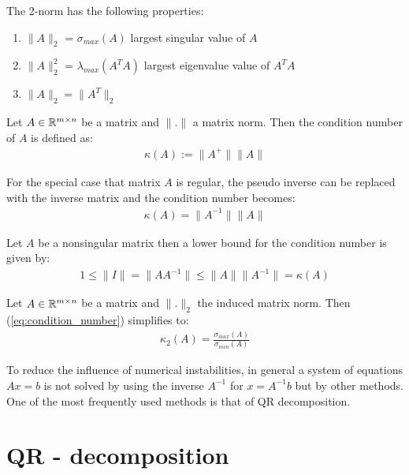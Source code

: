 \begin{remark}
	The 2-norm has the following properties:
	\begin{enumerate}
		\item $\lVert A \rVert_2$ = $\sigma_{max}(A)$ \hfill largest singular value of $A$
		\item $\lVert A \rVert_2^2$ = $\lambda_{max}(A^T A)$ \hfill largest eigenvalue value of $A^T A$
		\item $\lVert A \rVert_2 = \lVert A^T \rVert_2$
	\end{enumerate}
\end{remark}

\begin{definition}
	Let $A \in \mathbb{R}^{m \times n}$ be a matrix and $\lVert . \rVert$ a matrix norm. Then the condition number of $A$ is defined as:	
	\begin{align}\label{eq:condition_number}
	\kappa(A) := \lVert A^+ \rVert \lVert A \rVert
	\end{align}
\end{definition}

\begin{remark}
	For the special case that matrix $A$ is regular, the pseudo inverse can be replaced with the inverse matrix and the condition number becomes:
	\begin{align}
	\kappa(A) = \lVert A^{-1} \rVert \lVert A \rVert
	\end{align}	
\end{remark}

\begin{remark}
	Let $A$ be a nonsingular matrix then a lower bound for the condition number is given by: 
	\begin{align*}
	 1 \leq \lVert I \rVert = \lVert A A^{-1} \rVert \leq \lVert A \rVert \lVert A^{-1} \rVert = \kappa(A)
	\end{align*}
\end{remark}

\begin{remark}
	Let $A \in \mathbb{R}^{m \times n}$ be a matrix and $\lVert . \rVert_2$ the induced matrix norm. Then (\ref{eq:condition_number}) simplifies to: 
	\begin{align*}
		\kappa_2(A) = \frac{\sigma_{max}(A)}{\sigma_{min}(A)}
	\end{align*}	
\end{remark}

To reduce the influence of numerical instabilities, in general a system of equations $Ax = b$ is not solved by using the inverse $A^{-1}$ for $x=A^{-1}b$ but by other methods. One of the most frequently used methods is that of QR decomposition.  

\section{QR - decomposition}

